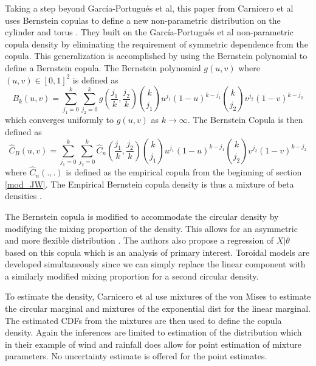 
Taking a step beyond Garc\'{i}a-Portugu\'{e}s et al, this paper from Carnicero et al uses Bernstein copulas to define a new non-parametric distribution on the cylinder and torus \cite{carnicero_non-parametric_2013}. They built on the Garc\'{i}a-Portugu\'{e}s et al non-parametric copula density by eliminating the requirement of symmetric dependence from the copula. This generalization is accomplished by using the Bernstein polynomial to define a Bernstein copula\cite{carnicero_non-parametric_2013}. The Bernstein polynomial $g(u,v)$ where $(u,v) \in [0,1]^2$ is defined as \[B_k(u,v) = \sum_{j_1 = 0}^k \sum_{j_2 = 0}^k g\left(\frac{j_1}{k}, \frac{j_2}{k}\right) {k \choose j_1} u^{j_1} (1 - u)^{k- j_1} {k \choose j_2} v^{j_2} (1 - v)^{k - j_2}\] which converges uniformly to $g(u,v)$ as $k \rightarrow \infty$. The Bernstein Copula is then defined as \[\hat{C}_B(u,v) = \sum_{j_1 = 0}^k \sum_{j_2 = 0}^k \hat{C}_n\left(\frac{j_1}{k}, \frac{j_2}{k}\right) {k \choose j_1} u^{j_1} (1 - u)^{k - j_1} {k \choose j_2} v^{j_2} (1 - v)^{k - j_2}\] where $\hat{C}_n(.,.)$ is defined as the empirical copula from the beginning of section \ref{mod_JW}. The Empirical Bernstein copula density is thus a mixture of beta densities \cite{carnicero_non-parametric_2013}.

The Bernstein copula is modified to accommodate the circular density by modifying the mixing proportion of the density. This allows for an asymmetric and more flexible distribution \cite{carnicero_non-parametric_2013}. The authors also propose a regression of $X | \theta$ based on this copula which is an analysis of primary interest. Toroidal models are developed simultaneously since we can simply replace the linear component with a similarly modified mixing proportion for a second circular density.  

To estimate the density, Carnicero et al use mixtures of the von Mises to estimate the circular marginal and mixtures of the exponential dist for the linear marginal. The estimated CDFs from the mixtures are then used to define the copula density. Again the inferences are limited to estimation of the distribution which in their example of wind and rainfall does allow for point estimation of mixture parameters\cite{carnicero_non-parametric_2013}. No uncertainty estimate is offered for the point estimates.


